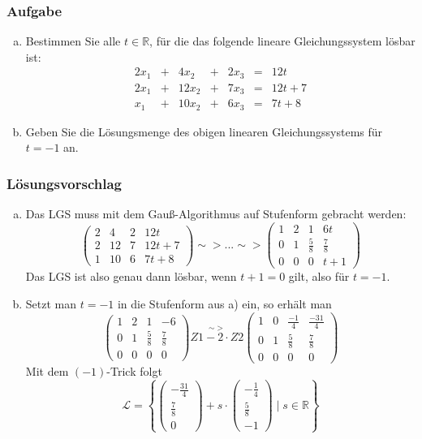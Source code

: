 \documentclass[a4paper,11pt]{scrartcl}
\newcounter{auf}
\newcommand{\Aufgabe}%
        {\addtocounter{auf}{1} \subsubsection*{\rmfamily  Aufgabe \theauf \hspace{1em}} }
\newcommand{\RR}{\mathbb{R}}
\begin{document}
\newpage
\Aufgabe
\begin{enumerate}[a)]
\item Bestimmen Sie alle $t\in\RR$, für die das folgende lineare Gleichungssystem lösbar ist:
\[\begin{array}{rrrrrrrrr}
2x_1&+&4x_2&+&2x_3&=&12t\\
2x_1&+&12x_2&+&7x_3&=&12t+7\\
x_1&+&10x_2&+&6x_3&=&7t+8
\end{array}\]
\item Geben Sie die Lösungsmenge des obigen linearen Gleichungssystems für $t=-1$ an.
\end{enumerate}


\subsubsection*{Lösungsvorschlag}
\begin{enumerate}[a)]
\item Das LGS muss mit dem Gauß-Algorithmus auf Stufenform gebracht werden:
$$
\left( \begin{array}{ccc|c} 2&4&2 &12t\\ 2 & 12 & 7 & 12t+7\\1&10&6&7t+8 \end{array}\right) \sim> ... \sim> \left( \begin{array}{ccc|c} 1&2&1&6t\\0&1&\frac{5}{8} & \frac{7}{8} \\ 0&0&0&t+1 \end{array} \right)
$$
Das LGS ist also genau dann lösbar, wenn $t+1=0$ gilt, also für $t=-1$.
\item Setzt man $t=-1$ in die Stufenform aus a) ein, so erhält man
$$
\left( \begin{array}{ccc|c} 1&2&1&-6\\0&1&\frac{5}{8} & \frac{7}{8} \\ 0&0&0&0 \end{array} \right) \stackrel{\sim>}{Z1-2\cdot Z2}\left( \begin{array}{ccc|c} 1&0&\frac{-1}{4}&\frac{-31}{4}\\0&1&\frac{5}{8} & \frac{7}{8} \\ 0&0&0&0 \end{array} \right)
$$
Mit dem $(-1)$-Trick folgt 
$$
\mathcal{L}=\left\{ \begin{pmatrix}-\frac{31}{4}\\\frac{7}{8}\\0 \end{pmatrix} +s \cdot \begin{pmatrix}-\frac{1}{4}\\\frac{5}{8}\\-1 \end{pmatrix} \mid s \in \RR \right\}
$$
\end{enumerate}
\end{document}
